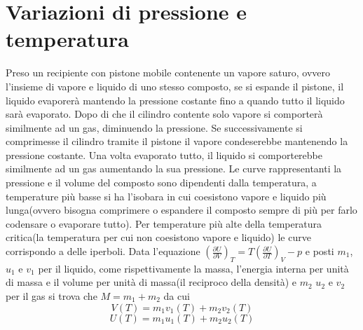 \documentclass{article}
\begin{document}
\section{Variazioni di pressione e temperatura}
Preso un recipiente con pistone mobile contenente un vapore saturo, ovvero l'insieme di vapore e liquido di uno stesso composto, se si espande il pistone, il liquido evaporerà mantendo la pressione costante fino a quando tutto il liquido sarà evaporato. Dopo di che il cilindro contente solo vapore si comporterà similmente ad un gas, diminuendo la pressione. Se successivamente si comprimesse il cilindro tramite il pistone il vapore condeserebbe mantenendo la pressione costante. Una volta evaporato tutto, il liquido si comporterebbe similmente ad un gas aumentando la sua pressione. Le curve rappresentanti la pressione e il volume del composto sono dipendenti dalla temperatura, a temperature più basse si ha l'isobara in cui coesistono vapore e liquido più lunga(ovvero bisogna comprimere o espandere il composto sempre di più per farlo codensare o evaporare tutto). Per temperature più alte della temperatura critica(la temperatura per cui non coesistono vapore e liquido) le curve corrispondo a delle iperboli.
Data l'equazione ${(\frac{\partial U}{\partial V})}_T=T{(\frac{\partial U}{\partial T})}_V-p$ e posti $m_1$, $u_1$ e $v_1$ per il liquido, come rispettivamente la massa, l'energia interna per unità di massa e il volume per unità di massa(il reciproco della densità) e $m_2$ $u_2$ e $v_2$ per il gas si trova che $M=m_1+m_2$ da cui 
\begin{equation}
V(T)=m_1 v_1(
T)+m_2 v_2(T)
\end{equation}
\begin{equation}
U(T)=m_1 u_1(T)+m_2 u_2(T)
\end{equation} 

%
%
\end{document}
